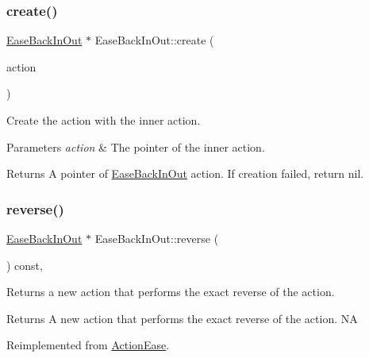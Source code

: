 \subsubsection{\texorpdfstring{create()}{create()}}
{\footnotesize\ttfamily \hyperlink{classEaseBackInOut}{Ease\+Back\+In\+Out} $\ast$ Ease\+Back\+In\+Out\+::create (\begin{DoxyParamCaption}\item[{\hyperlink{classActionInterval}{Action\+Interval} $\ast$}]{action }\end{DoxyParamCaption})\hspace{0.3cm}{\ttfamily [static]}}



Create the action with the inner action. 


\begin{DoxyParams}{Parameters}
{\em action} & The pointer of the inner action. \\
\hline
\end{DoxyParams}
\begin{DoxyReturn}{Returns}
A pointer of \hyperlink{classEaseBackInOut}{Ease\+Back\+In\+Out} action. If creation failed, return nil. 
\end{DoxyReturn}
\mbox{\label{classEaseBackInOut_ab78f59eef3912ce006b0888eed4aac5c}} 
\subsubsection{\texorpdfstring{reverse()}{reverse()}}
{\footnotesize\ttfamily \hyperlink{classEaseBackInOut}{Ease\+Back\+In\+Out} $\ast$ Ease\+Back\+In\+Out\+::reverse (\begin{DoxyParamCaption}\item[{void}]{ }\end{DoxyParamCaption}) const\hspace{0.3cm}{\ttfamily [override]}, {\ttfamily [virtual]}}

Returns a new action that performs the exact reverse of the action.

\begin{DoxyReturn}{Returns}
A new action that performs the exact reverse of the action.  NA 
\end{DoxyReturn}


Reimplemented from \hyperlink{classActionEase_ab99eb083fa033fae1d6c948fdc730782}{Action\+Ease}.


